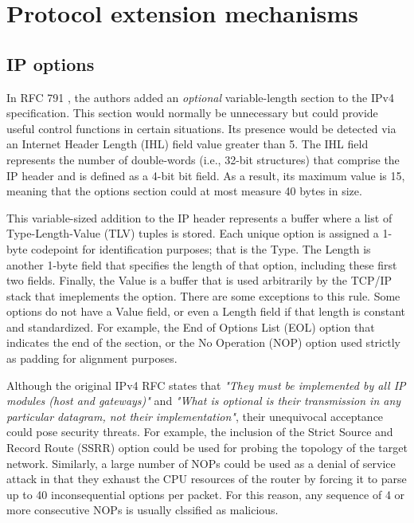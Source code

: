 \section{Protocol extension mechanisms}
\label{background:protocols}

\subsection{IP options}

In RFC 791 \cite{RFC0791}, the authors added an \textit{optional} variable-length
section to the IPv4 specification. This section would normally be unnecessary but
could provide useful control functions in certain situations. Its presence would
be detected via an Internet Header Length (IHL) field value greater than 5. The
IHL field represents the number of double-words (i.e., 32-bit structures) that
comprise the IP header and is defined as a 4-bit bit field. As a result, its
maximum value is 15, meaning that the options section could at most measure 40
bytes in size.

This variable-sized addition to the IP header represents a buffer where a list
of Type-Length-Value (TLV) tuples is stored. Each unique option is assigned a
1-byte codepoint for identification purposes; that is the Type. The Length is
another 1-byte field that specifies the length of that option, including these
first two fields. Finally, the Value is a buffer that is used arbitrarily by
the TCP/IP stack that imeplements the option. There are some exceptions to this
rule. Some options do not have a Value field, or even a Length field if that
length is constant and standardized. For example, the End of Options List (EOL)
option that indicates the end of the section, or the No Operation (NOP) option
used strictly as padding for alignment purposes.

Although the original IPv4 RFC states that \textit{"They must be implemented by
all IP modules (host and gateways)"} and \textit{"What is optional is their
transmission in any particular datagram, not their implementation"}, their
unequivocal acceptance could pose security threats. For example, the inclusion
of the Strict Source and Record Route (SSRR) option could be used for probing
the topology of the target network. Similarly, a large number of NOPs could be
used as a denial of service attack in that they exhaust the CPU resources of the
router by forcing it to parse up to 40 inconsequential options per packet. For
this reason, any sequence of 4 or more consecutive NOPs is usually clssified as
malicious.

